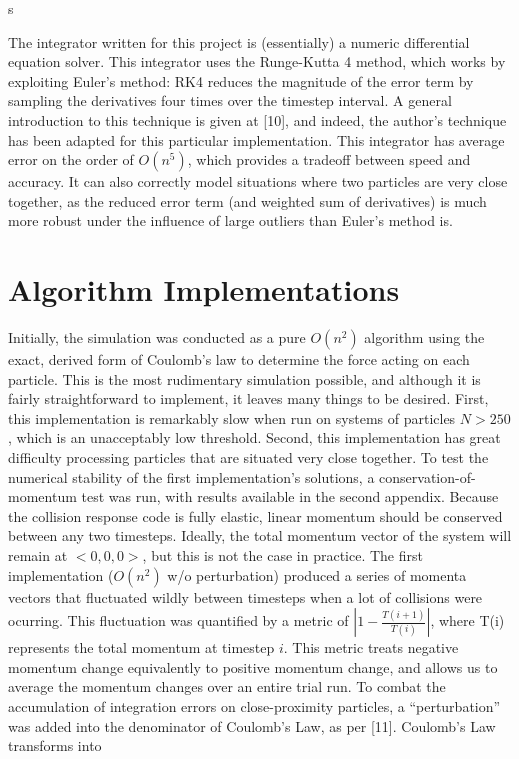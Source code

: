 s\documentclass[10pt]{article}
\begin{document}
The integrator written for this project is (essentially) a numeric differential equation solver. This integrator uses the Runge-Kutta 4 method, which works by exploiting Euler's method: RK4 reduces the magnitude of the error term by sampling the derivatives four times over the timestep interval. A general introduction to this technique is given at [10], and indeed, the author's technique has been adapted for this particular implementation. This integrator has average error on the order of $O(n^5)$, which provides a tradeoff between speed and accuracy. It can also correctly model situations where two particles are very close together, as the reduced error term (and weighted sum of derivatives) is much more robust under the influence of large outliers than Euler's method is.

\clearpage
\section{Algorithm Implementations}
Initially, the simulation was conducted as a pure $O(n^2)$ algorithm using the exact, derived form of Coulomb's law to determine the force acting on each particle. This is the most rudimentary simulation possible, and although it is fairly straightforward to implement, it leaves many things to be desired. First, this implementation is remarkably slow when run on systems of particles $N > 250$, which is an unacceptably low threshold. Second, this implementation has great difficulty processing particles that are situated very close together. To test the numerical stability of the first implementation's solutions, a conservation-of-momentum test was run, with results available in the second appendix. Because the collision response code is fully elastic, linear momentum should be conserved between any two timesteps. Ideally, the total momentum vector of the system will remain at $<0, 0, 0>$, but this is not the case in practice. The first implementation ($O(n^2)$ w/o perturbation) produced a series of momenta vectors that fluctuated wildly between timesteps when a lot of collisions were ocurring. This fluctuation was quantified by a metric of $|1 - \frac{T(i+1)}{T(i)}|$, where T(i) represents the total momentum at timestep $i$. This metric treats negative momentum change equivalently to positive momentum change, and allows us to average the momentum changes over an entire trial run. To combat the accumulation of integration errors on close-proximity particles, a ``perturbation'' was added into the denominator of Coulomb's Law, as per [11]. Coulomb's Law transforms into
\end{document}
